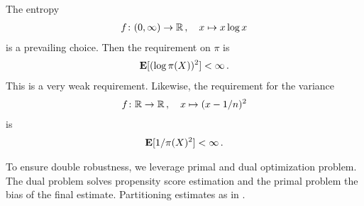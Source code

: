 \begin{remark}
  The entropy 
  \begin{gather*}
    f \colon (0, \infty)
    \to 
    \mathbb{R}
    \,,
    \quad
    x \mapsto x\log x
  \end{gather*}
  is a prevailing choice.
  Then the requirement on $\pi$ is
  \begin{gather*}
    \mathbf{E}
    [
    (
    \log \pi(X)
    )
    ^2
    ]
    <
    \infty
    \,.
  \end{gather*}
  This is a very weak requirement.
  Likewise, the requirement for the variance
  \begin{gather*}
    f \colon 
    \mathbb{R}
    \to 
    \mathbb{R}
    \,,
    \quad
    x \mapsto (x-1/n)^2
  \end{gather*}
  is
  \begin{gather*}
    \mathbf{E}
    [
    1/
    \pi(X)
    ^2
    ]
    <
    \infty
    \,.
  \end{gather*}
\end{remark}

\begin{takeaways}
  To ensure double robustness, we leverage primal and dual optimization
  problem. The dual problem solves propensity score estimation and the 
  primal problem the bias of the final estimate.
  Partitioning estimates as in \cite{Gyorfi2002}. 
\end{takeaways}

